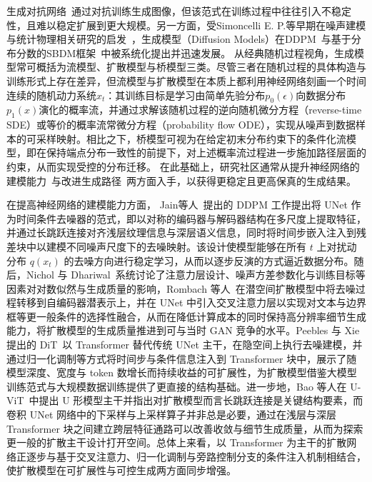 生成对抗网络~\cite{goodfellow2020generative}通过对抗训练生成图像，但该范式在训练过程中往往引入不稳定性，且难以稳定扩展到更大规模。另一方面，受Simoncelli E. P.等早期在噪声建模与统计物理相关研究的启发~\cite{simoncelli1996noise,hyvarinen2005estimation,sohl2015deep}，生成模型（Diffusion Models）在DDPM~\cite{ho2020denoising}与基于分布分数的SBDM框架~\cite{song2021maximum,song2020score}中被系统化提出并迅速发展。
从经典随机过程视角，生成模型常可概括为流模型、扩散模型与桥模型三类。尽管三者在随机过程的具体构造与训练形式上存在差异，但流模型与扩散模型在本质上都利用神经网络刻画一个时间连续的随机动力系统${x_t}$：其训练目标是学习由简单先验分布$p_0(\epsilon)$向数据分布$p_1(x)$演化的概率流，并通过求解该随机过程的逆向随机微分方程（reverse-time SDE）或等价的概率流常微分方程（probability flow ODE），实现从噪声到数据样本的可采样映射。相比之下，桥模型可视为在给定初末分布约束下的条件化流模型，即在保持端点分布一致性的前提下，对上述概率流过程进一步施加路径层面的约束，从而实现受控的分布迁移。
在此基础上，研究社区通常从提升神经网络的建模能力~\cite{ho2020denoising,nichol2021improved,rombach2022high,peebles2023scalable,bao2023all}与改进生成路径~\cite{lipman2022flow,peluchetti2023non,tong2023improving,shi2023diffusion,zhou2024denoising}两方面入手，以获得更稳定且更高保真的生成结果。


在提高神经网络的建模能力方面，
Jain等人~\cite{ho2020denoising}提出的 DDPM 工作提出将 UNet 作为时间条件去噪器的范式，即以对称的编码器与解码器结构在多尺度上提取特征，并通过长跳跃连接对齐浅层纹理信息与深层语义信息，同时将时间步嵌入注入到残差块中以建模不同噪声尺度下的去噪映射。该设计使模型能够在所有 $t$ 上对扰动分布 $q(x_t)$ 的去噪方向进行稳定学习，从而以逐步反演的方式逼近数据分布。随后，Nichol 与 Dhariwal~\cite{nichol2021improved}系统讨论了注意力层设计、噪声方差参数化与训练目标等因素对对数似然与生成质量的影响，Rombach 等人~\cite{rombach2022high}在潜空间扩散模型中将去噪过程转移到自编码器潜表示上，并在 UNet 中引入交叉注意力层以实现对文本与边界框等更一般条件的选择性融合，从而在降低计算成本的同时保持高分辨率细节生成能力，将扩散模型的生成质量推进到可与当时 GAN 竞争的水平。Peebles 与 Xie 提出的 DiT~\cite{peebles2023scalable}以 Transformer 替代传统 UNet 主干，在隐空间上执行去噪建模，并通过归一化调制等方式将时间步与条件信息注入到 Transformer 块中，展示了随模型深度、宽度与 token 数增长而持续收益的可扩展性，为扩散模型借鉴大模型训练范式与大规模数据训练提供了更直接的结构基础。进一步地，Bao 等人在 U-ViT~\cite{bao2023all}中提出 U 形模型主干并指出对扩散模型而言长跳跃连接是关键结构要素，而卷积 UNet 网络中的下采样与上采样算子并非总是必要，通过在浅层与深层 Transformer 块之间建立跨层特征通路可以改善收敛与细节生成质量，从而为探索更一般的扩散主干设计打开空间。总体上来看，以 Transformer 为主干的扩散网络正逐步与基于交叉注意力、归一化调制与旁路控制分支的条件注入机制相结合，使扩散模型在可扩展性与可控生成两方面同步增强。

